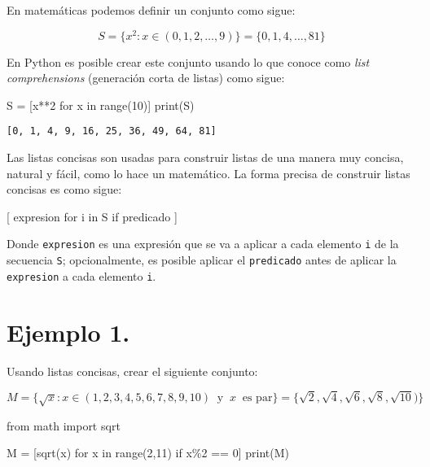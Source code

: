 \documentclass[
  letterpaper,
  DIV=11,
  numbers=noendperiod]{scrreprt}
\newenvironment{Shaded}{\begin{snugshade}}{\end{snugshade}}
\newcommand{\BuiltInTok}[1]{\textcolor[rgb]{0.00,0.23,0.31}{#1}}
\newcommand{\ControlFlowTok}[1]{\textcolor[rgb]{0.00,0.23,0.31}{#1}}
\newcommand{\DecValTok}[1]{\textcolor[rgb]{0.68,0.00,0.00}{#1}}
\newcommand{\ImportTok}[1]{\textcolor[rgb]{0.00,0.46,0.62}{#1}}
\newcommand{\KeywordTok}[1]{\textcolor[rgb]{0.00,0.23,0.31}{#1}}
\newcommand{\NormalTok}[1]{\textcolor[rgb]{0.00,0.23,0.31}{#1}}
\newcommand{\OperatorTok}[1]{\textcolor[rgb]{0.37,0.37,0.37}{#1}}
\begin{document}
En matemáticas podemos definir un conjunto como sigue:

\[S = \{x^2 : x \in (0, 1, 2, \dots, 9)\} = \{0, 1, 4, \dots, 81\}\]

En Python es posible crear este conjunto usando lo que conoce como
\emph{list comprehensions} (generación corta de listas) como sigue:

\begin{Shaded}
\begin{Highlighting}[]
\NormalTok{S }\OperatorTok{=}\NormalTok{ [x}\OperatorTok{**}\DecValTok{2} \ControlFlowTok{for}\NormalTok{ x }\KeywordTok{in} \BuiltInTok{range}\NormalTok{(}\DecValTok{10}\NormalTok{)]}
\BuiltInTok{print}\NormalTok{(S)}
\end{Highlighting}
\end{Shaded}

\begin{verbatim}
[0, 1, 4, 9, 16, 25, 36, 49, 64, 81]
\end{verbatim}

Las listas concisas son usadas para construir listas de una manera muy
concisa, natural y fácil, como lo hace un matemático. La forma precisa
de construir listas concisas es como sigue:

\begin{Shaded}
\begin{Highlighting}[]
\NormalTok{[ expresion }\ControlFlowTok{for}\NormalTok{ i }\KeywordTok{in}\NormalTok{ S }\ControlFlowTok{if}\NormalTok{ predicado ]}
\end{Highlighting}
\end{Shaded}

Donde \texttt{expresion} es una expresión que se va a aplicar a cada
elemento \texttt{i} de la secuencia \texttt{S}; opcionalmente, es
posible aplicar el \texttt{predicado} antes de aplicar la
\texttt{expresion} a cada elemento \texttt{i}.

\section{\texorpdfstring{\textbf{Ejemplo
1.}}{Ejemplo 1.}}\label{ejemplo-1.-4}

Usando listas concisas, crear el siguiente conjunto:

\[
M = \{\sqrt{x} : x \in (1,2,3,4,5,6,7,8,9,10) \;\; \text{y} \;\; x \;\; \text{es par}\} = \{ \sqrt{2}, \sqrt{4}, \sqrt{6}, \sqrt{8}, \sqrt{10}) \}
\]

\begin{Shaded}
\begin{Highlighting}[]
\ImportTok{from}\NormalTok{ math }\ImportTok{import}\NormalTok{ sqrt}

\NormalTok{M }\OperatorTok{=}\NormalTok{ [sqrt(x) }\ControlFlowTok{for}\NormalTok{ x }\KeywordTok{in} \BuiltInTok{range}\NormalTok{(}\DecValTok{2}\NormalTok{,}\DecValTok{11}\NormalTok{) }\ControlFlowTok{if}\NormalTok{ x}\OperatorTok{\%}\DecValTok{2} \OperatorTok{==} \DecValTok{0}\NormalTok{]}
\BuiltInTok{print}\NormalTok{(M)}
\end{Highlighting}
\end{Shaded}
\end{document}
